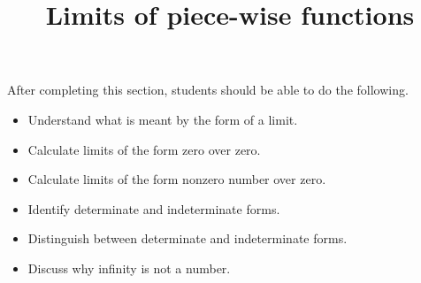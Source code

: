 \documentclass{ximera}
\title{Limits of piece-wise functions}
\begin{document}
\begin{abstract}
\end{abstract}
\maketitle

\begin{sectionOutcomes}
After completing this section, students should be able to do the following. %

\begin{itemize}
\item Understand what is meant by the form of a limit.
\item Calculate limits of the form zero over zero.
\item Calculate limits of the form nonzero number over zero.
\item Identify determinate and indeterminate forms.
\item Distinguish between determinate and indeterminate forms.
\item Discuss why infinity is not a number.
\end{itemize}
\end{sectionOutcomes}
\end{document}
